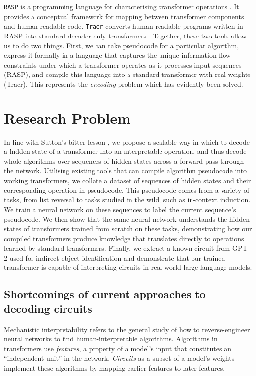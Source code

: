 \documentclass[11pt]{scrartcl}
\begin{document}
\texttt{RASP} is a programming language for characterising transformer operations \cite{weiss2021thinking}. It provides a conceptual framework for mapping between transformer components and human-readable code. \texttt{Tracr} converts human-readable programs written in RASP into standard decoder-only transformers \cite{lindner2024tracr}. Together, these two tools allow us to do two things. First, we can take pseudocode for a particular algorithm, express it formally in a language that captures the unique information-flow constraints under which a transformer operates as it processes input sequences (RASP), and compile this language into a standard transformer with real weights (Tracr). This represents the \textit{encoding} problem which has evidently been solved.


\section{Research Problem}

In line with Sutton's bitter lesson \cite{sutton2019bitter}, we propose a scalable way in which to decode a hidden state of a transformer into an interpretable operation, and thus decode whole algorithms over sequences of hidden states across a forward pass through the network. Utilising existing tools that can compile algorithm pseudocode into working transformers, we collate a dataset of sequences of hidden states and their corresponding operation in pseudocode. This pseudocode comes from a variety of tasks, from list reversal to tasks studied in the wild, such as in-context induction. We train a neural network on these sequences to label the current sequence's pseudocode. We then show that the same neural network understands the hidden states of transformers trained from scratch on these tasks, demonstrating how our compiled transformers produce knowledge that translates directly to operations learned by standard transformers. Finally, we extract a known circuit from GPT-2 used for indirect object identification and demonstrate that our trained transformer is capable of interpreting circuits in real-world large language models. 

\subsection{Shortcomings of current approaches to decoding circuits}
Mechanistic interpretability refers to the general study of how to reverse-engineer neural networks to find human-interpretable algorithms. Algorithms in transformers use \textit{features}, a property of a model's input that constitutes an ``independent unit'' in the network. \textit{Circuits} as a subset of a model's weights implement these algorithms by mapping earlier features to later features. 
\end{document}
